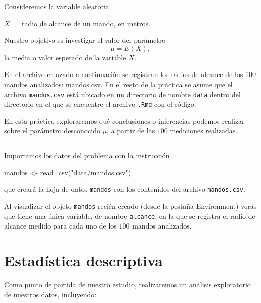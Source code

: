 \documentclass[
  title=normal,
  notoc,
  nobib,
  degree=mecinf]{mnye}
\newenvironment{Shaded}{\begin{snugshade}}{\end{snugshade}}
\newcommand{\FunctionTok}[1]{\textcolor[rgb]{0.00,0.00,0.00}{#1}}
\newcommand{\NormalTok}[1]{#1}
\newcommand{\OtherTok}[1]{\textcolor[rgb]{0.56,0.35,0.01}{#1}}
\newcommand{\StringTok}[1]{\textcolor[rgb]{0.31,0.60,0.02}{#1}}
\begin{document}
Consideremos la variable aleatoria

\begin{center}
\(X =\) radio de alcance de un mando, en metros.

\end{center}

Nuestro objetivo es investigar el valor del parámetro
\[
\mu = E(X),
\]
la media o valor esperado de la variable \(X\).

En el archivo enlazado a continuación se registran los radios de alcance de los \(100\) mandos analizados: \href{https://drive.google.com/uc?id=1dDOdobanG-_ZTTh0mx1R6KRSrnvtD8gL\&export=download}{mandos.csv}. En el resto de la práctica se asume que el archivo \texttt{mandos.csv} está ubicado en un directorio de nombre \texttt{data} dentro del directorio en el que se encuentre el archivo \texttt{.Rmd} con el código.

En esta práctica exploraremos qué conclusiones o inferencias podemos realizar sobre el parámetro desconocido \(\mu\), a partir de las \(100\) mediciones realizadas.

\begin{center}\rule{0.5\linewidth}{0.5pt}\end{center}

Importamos los datos del problema con la instrucción

\begin{Shaded}
\begin{Highlighting}[]
\NormalTok{mandos }\OtherTok{\textless{}{-}} \FunctionTok{read\_csv}\NormalTok{(}\StringTok{"data/mandos.csv"}\NormalTok{)}
\end{Highlighting}
\end{Shaded}

que creará la hoja de datos \texttt{mandos} con los contenidos del archivo \texttt{mandos.csv}.

Al visualizar el objeto \texttt{mandos} recién creado (desde la pestaña Environment) verás que tiene una única variable, de nombre \texttt{alcance}, en la que se registra el radio de alcance medido para cada uno de los \(100\) mandos analizados.

\hypertarget{descriptive}{%
\section{Estadística descriptiva}\label{descriptive}}

Como punto de partida de nuestro estudio, realizaremos un análisis exploratorio de nuestros datos, incluyendo:
\end{document}

